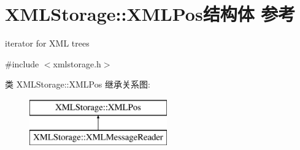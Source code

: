\hypertarget{struct_x_m_l_storage_1_1_x_m_l_pos}{}\section{X\+M\+L\+Storage\+:\+:X\+M\+L\+Pos结构体 参考}
\label{struct_x_m_l_storage_1_1_x_m_l_pos}


iterator for X\+ML trees  




{\ttfamily \#include $<$xmlstorage.\+h$>$}

类 X\+M\+L\+Storage\+:\+:X\+M\+L\+Pos 继承关系图\+:\begin{figure}[H]
\begin{center}
\leavevmode
\includegraphics[height=2.000000cm]{struct_x_m_l_storage_1_1_x_m_l_pos}
\end{center}
\end{figure}
